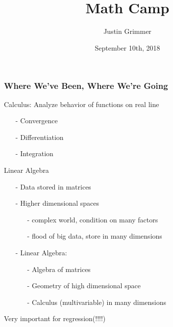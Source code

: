 \documentclass{beamer}
\title[Methodology I] %
{Math Camp}
\author{Justin Grimmer}
\institute[Stanford University]{Professor\\Department of Political Science \\  Stanford University}
\date{September 10th, 2018}
\numberwithin{equation}{section}
\begin{document}
\begin{frame}
\titlepage
\end{frame}


\begin{frame}
\frametitle{Where We've Been, Where We're Going}

Calculus: \alert{Analyze behavior of functions on real line}
\begin{itemize}
\item[-] Convergence
\item[-] Differentiation 
\item[-] Integration
\end{itemize}


\alert{Linear Algebra} 
\begin{itemize}
\item[-] \alert{Data} stored in \alert{matrices}
\item[-]  Higher dimensional spaces
\begin{itemize}
\item[-] \alert{complex world}, condition on many factors
\item[-] flood of big data, store in many dimensions
\end{itemize}
\item[-] Linear Algebra: 
\begin{itemize}
\item[-] \alert{Algebra} of matrices
\item[-] \alert{Geometry} of high dimensional space 
\item[-] \alert{Calculus} (multivariable) in many dimensions
\end{itemize}
\end{itemize}

\alert{Very important for regression}(!!!!)


\end{frame}
\end{document}
